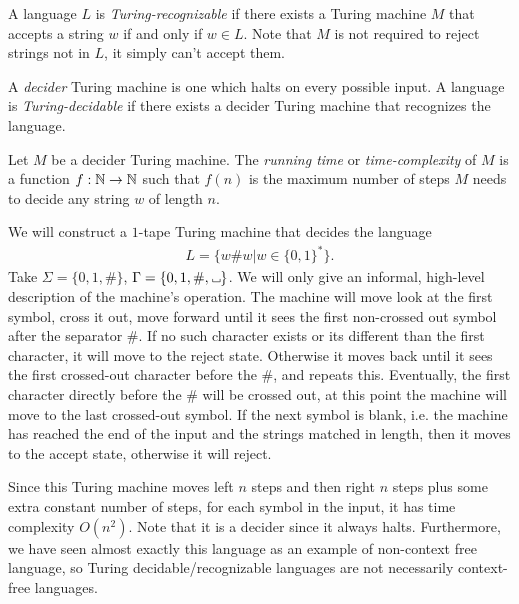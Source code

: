 \begin{defn}
    A language $L$ is \emph{Turing-recognizable} if there exists a Turing machine $M$ that accepts a string $w$ if and only if $w \in L$. Note that $M$ is not required to reject strings not in $L$, it simply can't accept them.
\end{defn}

\begin{defn}
    A \emph{decider} Turing machine is one which halts on every possible input. A language is \emph{Turing-decidable} if there exists a decider Turing machine that recognizes the language.
\end{defn}

\begin{defn}
    Let $M$ be a decider Turing machine. The \emph{running time} or \emph{time-complexity} of $M$ is a function $f: \mathbb{N} \to \mathbb{N}$ such that $f(n)$ is the maximum number of steps $M$ needs to decide any string $w$ of length $n$.
\end{defn}

\begin{exmp}
    We will construct a $1$-tape Turing machine that decides the language
    \begin{align*}
        L = \{w\#w | w \in \{0, 1\}^{*}\}.
    \end{align*}
    Take $\Sigma = \{0, 1, \#\}$, $\Gamma = \{0, 1, \#, \tapeblank\}$. We will only give an informal, high-level description of the machine's operation. The machine will move look at the first symbol, cross it out, move forward until it sees the first non-crossed out symbol after the separator \#. If no such character exists or its different than the first character, it will move to the reject state. Otherwise it moves back until it sees the first crossed-out character before the \#, and repeats this. Eventually, the first character directly before the \# will be crossed out, at this point the machine will move to the last crossed-out symbol. If the next symbol is blank, i.e. the machine has reached the end of the input and the strings matched in length, then it moves to the accept state, otherwise it will reject.

    Since this Turing machine moves left $n$ steps and then right $n$ steps plus some extra constant number of steps, for each symbol in the input, it has time complexity $O(n^2)$. Note that it is a decider since it always halts. Furthermore, we have seen almost exactly this language as an example of non-context free language, so Turing decidable/recognizable languages are not necessarily context-free languages.
\end{exmp}

